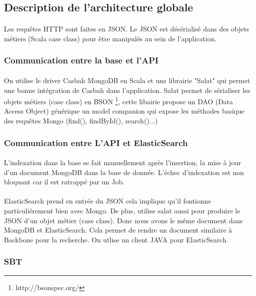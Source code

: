 \documentclass[11pt]{article} %
\begin{document}
\subsection{Description de l'architecture globale}
\paragraph{}
Les requêtes HTTP sont faites en JSON.
Le JSON est désérialisé dans des objets métiers 
(Scala case class) pour être manipulés au sein de l'application.
\subsubsection{Communication entre la base et l'API}
\paragraph{}
On utilise le driver Casbah MongoDB en Scala et une librairie "Salat" qui permet une bonne intégration de Casbah dans l'application.
Salat permet de sérialiser les objets métiers (case class) en BSON \footnote{http://bsonspec.org/}, cette libairie propose un DAO (Data Access Object) générique un model companion qui expose les méthodes basique des requêtes Mongo (find(), findById(), search()...)
\subsubsection{Communication entre L'API et ElasticSearch}
\paragraph{}
L'indexation dans la base se fait manuellement après l'insertion, la mise à jour d'un document MongoDB dans la base de donnée.
L'échec d'indexation est non bloquant car il est ratrappé par un Job.
\paragraph{}
ElasticSearch prend en entrée du JSON cela implique qu'il fontionne particuliérement bien avec Mongo.
De plus, utilise salat aussi pour produire le JSON d'un objet métier (case class).
Donc nous avons le même document dans MongoDB et ElasticSearch. Cela permet de rendre un document similaire à Backbone pour la recherche.
On utlise un client JAVA pour ElasticSearch.
\subsubsection{SBT}
\end{document}
